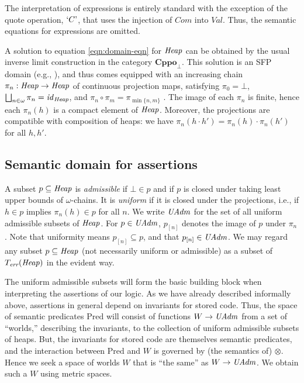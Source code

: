 \documentclass{LMCS}
\theoremstyle{remark}
\newcommand{\Val}{\ensuremath{\mathit{Val}}\xspace}
\newcommand{\Com}{\ensuremath{\mathit{Com}}\xspace}
\newcommand{\QUOTE}[1]{\textnormal{`\ensuremath{#1}'}}
\newcommand{\id}{\ensuremath{\mathit{id}}}
\newcommand{\COMB}{\ensuremath{\cdot}}
\newcommand{\TERR}{\ensuremath{T_\textit{err}}\xspace}
\newcommand{\Cppo}{\ensuremath{\textbf{Cppo}}\xspace}
\newcommand{\Pred}{\ensuremath{\mathrm{Pred}}\xspace}
\newcommand{\RANK}[2]{\ensuremath{{#1}_{[#2]}}}
\newcommand{\W}{\ensuremath{W}}
\begin{document}
The interpretation of  expressions is entirely standard with the exception  of the quote operation, $\QUOTE C$, that
uses the injection of $\Com$ into $\Val$. Thus, the semantic equations for expressions are omitted.


A solution to equation \eqref{eqn:domain-eqn} for $\mathit{Heap}$ can be obtained by the usual inverse limit construction \cite{Plotkin:Smyth:82} in the category $\Cppo_\bot$. This solution is an SFP domain (e.g., \cite{Streicher:06}), and thus comes equipped with an increasing chain $\pi_n:\mathit{Heap}\to\mathit{Heap}$ of continuous projection maps, satisfying 
$\pi_0 = \bot$, 
 $\bigsqcup_{n\in\omega} \pi_n = \id_\Heap$, 
and $\pi_n\circ\pi_m = \pi_{\min\{n,m\}}$ .
The image of each $\pi_n$ is finite, hence each $\pi_n(h)$ is a compact element of $\mathit{Heap}$. 
Moreover, the projections are compatible with composition of heaps: we have  $\pi_n(h\COMB h') = \pi_n(h)\cdot\pi_n(h')$ for all $h,h'$. 


\subsection{Semantic domain for assertions}
\label{subsec:Assertion-Domain}

A subset $p\subseteq\mathit{Heap}$ is \emph{admissible} if $\bot\in p$ and if $p$ is closed under taking least upper bounds of $\omega$-chains. It is \emph{uniform} \cite{Birkedal:Stovring:Thamsborg:09} if it is closed under the projections, i.e., if    $h\in p$ implies  $\pi_n(h)\in p$ for all $n$. 
We write $\mathit{UAdm}$ for the set of all uniform admissible subsets of $\mathit{Heap}$. For $p\in\mathit{UAdm}$, $\RANK{p}n$ denotes the image of $p$ under $\pi_n$. 
Note that uniformity means $\RANK{p}{n}\subseteq p$, and that $\RANK{p}n\in\UAdm$. 
We may regard any subset $p\subseteq\mathit{Heap}$ (not necessarily uniform or admissible) as a subset of $\TERR(\Heap)$ in the evident way. 


The uniform admissible subsets will form the basic building block when interpreting the assertions of our logic. As we have already described informally above, assertions in general depend on invariants for stored code. Thus, 
the space of semantic predicates $\Pred$ will consist of
functions $W\to\mathit{UAdm}$ from a set of ``worlds,'' describing the invariants,
to the collection of uniform admissible subsets of heaps. 
But, the invariants for stored code are themselves 
semantic predicates, and the interaction between $\Pred$ and $\W$ is governed by (the semantics of) $\otimes$. Hence we seek a space of worlds $W$  that is
``the same'' as $W\to\mathit{UAdm}$.  
We obtain such 
a $W$ using metric spaces.
\end{document}
